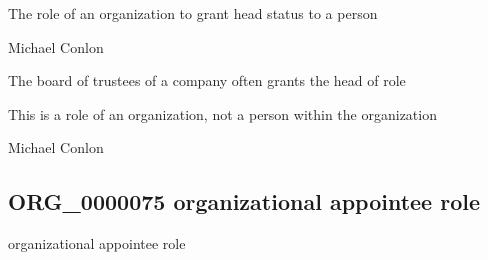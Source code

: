 \documentclass[letterpaper,10pt,english]{sphinxmanual}
\begin{document}
\begin{sphinxShadowBox}

\sphinxAtStartPar
{\hyperref[\detokenize{doc-BFO_0000023::doc}]{}}
\end{sphinxShadowBox}

\begin{sphinxShadowBox}

\sphinxAtStartPar
The role of an organization to grant head status to a person
\end{sphinxShadowBox}

\begin{sphinxShadowBox}

\sphinxAtStartPar
Michael Conlon 
\end{sphinxShadowBox}

\begin{sphinxShadowBox}

\sphinxAtStartPar
The board of trustees of a company often grants the head of role
\end{sphinxShadowBox}

\begin{sphinxShadowBox}

\sphinxAtStartPar
This is a role of an organization, not a person within the organization
\end{sphinxShadowBox}

\begin{sphinxShadowBox}

\sphinxAtStartPar
Michael Conlon 
\end{sphinxShadowBox}
\begin{quote}

\ignorespaces \end{quote}


\subsection{ORG\_0000075 \sphinxhyphen{} organizational appointee role}
\label{\detokenize{doc-ORG_0000075:org-0000075-organizational-appointee-role}}\label{\detokenize{doc-ORG_0000075:index-0}}\label{\detokenize{doc-ORG_0000075::doc}}
\begin{sphinxShadowBox}

\sphinxAtStartPar
organizational appointee role
\end{sphinxShadowBox}
\end{document}
